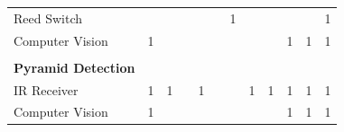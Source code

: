\documentclass[12pt]{article}
\begin{document}
\begin{figure}[htb!]
\begin{table}[H]
\begin{tabular}{p{15.645em}|c|c|c|c|c|c|c|c|c|c|c}
    Reed Switch &       &       &       &       &       & 1     &       &       &       &       & 1 \\
    Computer Vision & 1     &       &       &       &       &       &       &       & 1     & 1     & 1 \\
    \multicolumn{1}{r|}{} &       &       &       &       &       &       &       &       &       &       &  \\
    \midrule
    \textbf{Pyramid Detection} &       &       &       &       &       &       &       &       &       &       &  \\
\rowcolor{green}    IR Receiver & 1     & 1     &       & 1     &       &       & 1     & 1     & 1     & 1     & 1 \\
    Computer Vision & 1     &       &       &       &       &       &       &       & 1     & 1     & 1 \\
    \end{tabular}%
  \label{tab:addlabel}%
\end{table}%
\end{figure}
\FloatBarrier
\end{document}
